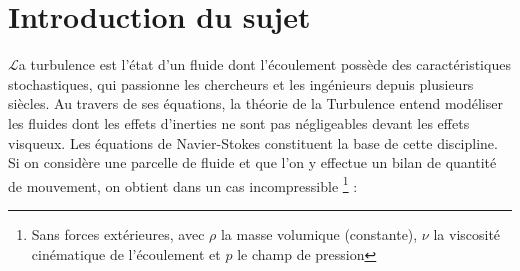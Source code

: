 \documentclass[a4paper,12pt]{article}
\newcommand\bk{\color{black}}
\newcommand\navy{\color{navy}}
\numberwithin{equation}{section} %
\begin{document}
\navy \section{Introduction du sujet}  \bk
\Large{$\mathscr{L}$}\normalsize a turbulence est l'état d'un fluide dont l'écoulement possède des caractéristiques stochastiques, qui passionne les chercheurs et les ingénieurs depuis plusieurs siècles. %
Au travers de ses équations, la théorie de la Turbulence entend modéliser les fluides dont les effets d'inerties ne sont pas négligeables devant les effets visqueux. Les équations de Navier-Stokes constituent la base de cette discipline. Si on considère une parcelle de fluide et que l'on y effectue un bilan de quantité de mouvement, on obtient dans un cas incompressible \footnote{Sans forces extérieures, avec $\rho$ la masse volumique (constante), $\nu$ la viscosité cinématique de l'écoulement et $p$  le champ de pression} :\\
\end{document}
